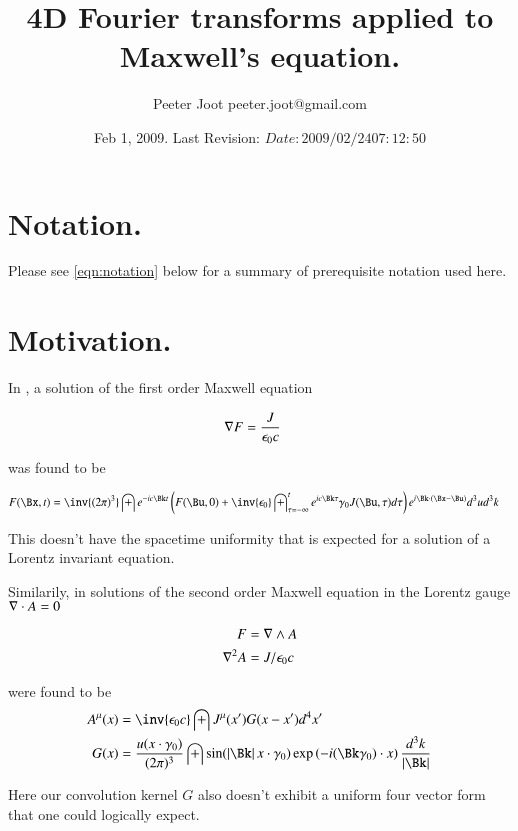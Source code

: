 \documentclass{article}
\title{ 4D Fourier transforms applied to Maxwell's equation. }
\author{Peeter Joot \quad peeter.joot@gmail.com}
\date{ Feb 1, 2009.  Last Revision: $Date: 2009/02/24 07:12:50 $ }
\begin{document}
\maketitle{}
\tableofcontents

\section{ Notation. }

Please see \ref{eqn:notation} below for a summary of prerequisite notation used here.

\section{ Motivation. }

In \cite{PJfirstOrderMaxwell}, a solution of the first order Maxwell equation

\begin{align}
\nabla F &= \frac{J }{\epsilon_0 c}
\end{align}

was found to be

\begin{align}
F(\Bx,t) 
&=
\inv{({2\pi})^3} \int 
e^{-i c \Bk t}
\left(
F(\Bu, 0) + \inv{\epsilon_0} \int_{\tau = -\infty}^{t} e^{i c \Bk \tau } \gamma_0 J(\Bu,\tau)  d\tau  
\right)
e^{i \Bk \cdot (\Bx-\Bu)} 
d^3 u
d^3 k
\end{align}

This doesn't have the spacetime uniformity that is expected for a solution of a Lorentz invariant equation.

Similarily, in \cite{PJfourierMaxwellSecondOrder} solutions of the second order Maxwell equation in the Lorentz gauge
$\nabla \cdot A = 0$ 

\begin{align*}
F &= \nabla \wedge A \\
\nabla^2 A &= J/\epsilon_0 c
\end{align*}

were found to be
\begin{align}\label{eqn:fourVectorPotentials}
{A^\mu}(x)
&= \inv{\epsilon_0 c} \int J^\mu(x') G(x - x') d^4 x' \\
G(x)
&= 
\frac{u(x \cdot \gamma_0)}{ (2\pi)^3 }
\int
\sin( \Abs{\Bk} x \cdot \gamma_0 )
\exp\left( -i (\Bk \gamma_0) \cdot x \right)
\frac{d^3 k}{ \Abs{\Bk} }
\end{align}

Here our convolution kernel $G$ also doesn't exhibit a uniform four vector form that one could logically expect.
\end{document}

